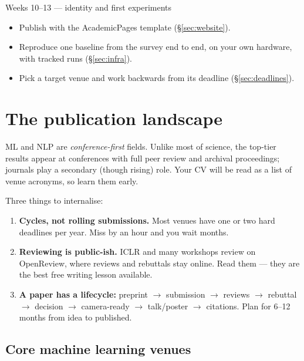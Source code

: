 \documentclass[11pt,a4paper]{article}
\begin{document}
\begin{cbox}{Weeks 10--13 --- identity and first experiments}
\begin{itemize}
  \item Publish  with the AcademicPages template
        (\S\ref{sec:website}).
  \item Reproduce one baseline from the survey end to end, on your own
        hardware, with tracked runs (\S\ref{sec:infra}).
  \item Pick a target venue and work backwards from its deadline
        (\S\ref{sec:deadlines}).
\end{itemize}
\end{cbox}

\section{The publication landscape}
\label{sec:venues}

ML and NLP are \emph{conference-first} fields. Unlike most of science, the
top-tier results appear at conferences with full peer review and archival
proceedings; journals play a secondary (though rising) role. Your CV will be
read as a list of venue acronyms, so learn them early.

Three things to internalise:

\begin{enumerate}
  \item \textbf{Cycles, not rolling submissions.} Most venues have one or two
        hard deadlines per year. Miss by an hour and you wait months.
  \item \textbf{Reviewing is public-ish.} ICLR and many workshops review on
        OpenReview, where reviews and rebuttals stay online. Read them --- they
        are the best free writing lesson available.
  \item \textbf{A paper has a lifecycle:} preprint $\rightarrow$ submission
        $\rightarrow$ reviews $\rightarrow$ rebuttal $\rightarrow$ decision
        $\rightarrow$ camera-ready $\rightarrow$ talk/poster $\rightarrow$
        citations. Plan for 6--12 months from idea to published.
\end{enumerate}

\subsection{Core machine learning venues}
\end{document}
